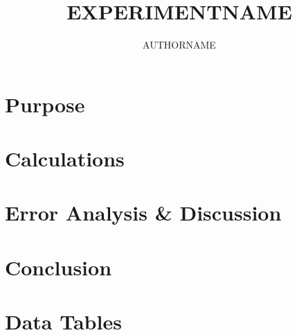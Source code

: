 \documentclass[11pt, titlepage]{article}
\author{AUTHORNAME}
\title{EXPERIMENTNAME}
\date{\parbox{\linewidth}{\centering%
  Conducted \experimentDate
  \endgraf\bigskip
  \className\ -- Section \sectionNumber\ -- \studentLabNum
}}
\begin{document}
	\maketitle
    
    \setcounter{tocdepth}{1}
    \begin{figure}
        \begin{center}
            \tableofcontents
        \end{center} 
    \end{figure}
    
    \section{Purpose}
    
    \section{Calculations}
    
    \section{Error Analysis \& Discussion}
    
    \section{Conclusion}
    
    \newpage
   	\section{Data Tables}
    
    
\end{document}

